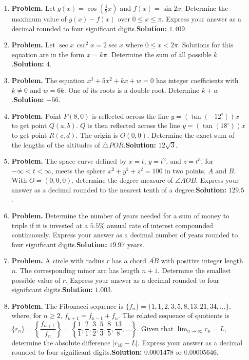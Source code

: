 \documentclass[10pt]{article}
\begin{document}
\begin{enumerate}
  \item \textbf{Problem.} Let $g(x)=\cos\left(\frac12x\right)$ and $f(x)=\sin 2x$. Determine the maximum value of $g(x)-f(x)$ over $0\leq x\leq\pi$. Express your answer as a decimal rounded to four significant digits.\quad \textbf{Solution:} $1.409$.
  \item \textbf{Problem.} Let $\sec x\,\csc^2x=2\sec x$ where $0\leq x<2\pi$. Solutions for this equation are in the form $x=k\pi$. Determine the sum of all possible $k$.\quad \textbf{Solution:} $4$.
  \item \textbf{Problem.} The equation $x^3+5x^2+kx+w=0$ has integer coefficients with $k\ne0$ and $w=6k$. One of its roots is a double root. Determine $k+w$.\quad \textbf{Solution:} $-56$.
  \item \textbf{Problem.} Point $P(8,0)$ is reflected across the line $y=(\tan(-12^\circ))x$ to get point $Q(a,b)$. $Q$ is then reflected across the line $y=(\tan(18^\circ))x$ to get point $R(c,d)$. The origin is $O(0,0)$. Determine the exact sum of the lengths of the altitudes of $\triangle POR$.\quad \textbf{Solution:} $12\sqrt3$.
  \item \textbf{Problem.} The space curve defined by $x=t$, $y=t^2$, and $z=t^3$, for $-\infty<t<\infty$, meets the sphere $x^2+y^2+z^2=100$ in two points, $A$ and $B$. With $O=(0,0,0)$, determine the degree measure of $\angle AOB$. Express your answer as a decimal rounded to the nearest tenth of a degree.\quad \textbf{Solution:} $129.5$.
  \item \textbf{Problem.} Determine the number of years needed for a sum of money to triple if it is invested at a $5.5\%$ annual rate of interest compounded continuously. Express your answer as a decimal number of years rounded to four significant digits.\quad \textbf{Solution:} $19.97$ years.
  \item \textbf{Problem.} A circle with radius $r$ has a chord $\overline{AB}$ with positive integer length $n$. The corresponding minor arc has length $n+1$. Determine the smallest possible value of $r$. Express your answer as a decimal rounded to four significant digits.\quad \textbf{Solution:} $1.003$.
  \item \textbf{Problem.} The Fibonacci sequence is $\{f_n\}=\{1,1,2,3,5,8,13,21,34,\ldots\}$, where, for $n\geq2$, $f_{n+1}=f_{n-1}+f_n$. The related sequence of quotients is $\{r_n\}=\left\{\dfrac{f_{n+1}}{f_n}\right\}=\left\{\dfrac11,\dfrac21,\dfrac32,\dfrac53,\dfrac85,\dfrac{13}{8},\ldots\right\}$. Given that $\lim_{n\to\infty}r_n=L$, determine the absolute difference $|r_{10}-L|$. Express your answer as a decimal rounded to four significant digits.\quad \textbf{Solution:} $0.0001478$ or $0.00005646$.

\end{enumerate}
\end{document}

